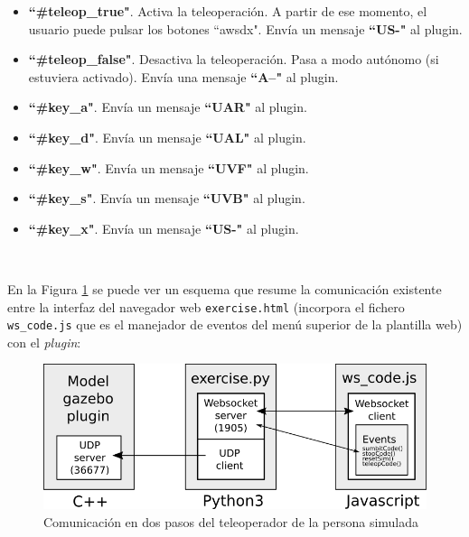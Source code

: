 \begin{itemize}
	\item \textbf{``\#teleop\_true"}. Activa la teleoperación. A partir de ese momento, el usuario puede pulsar los botones ``awsdx". Envía un mensaje \textbf{``US-"} al plugin.
	\item \textbf{``\#teleop\_false"}. Desactiva la teleoperación. Pasa a modo autónomo (si estuviera activado). Envía una mensaje \textbf{``A--"} al plugin.
	\item \textbf{``\#key\_a"}. Envía un mensaje \textbf{``UAR"} al plugin.
	\item \textbf{``\#key\_d"}. Envía un mensaje \textbf{``UAL"} al plugin.
	\item \textbf{``\#key\_w"}. Envía un mensaje \textbf{``UVF"} al plugin.
	\item \textbf{``\#key\_s"}. Envía un mensaje \textbf{``UVB"} al plugin.
	\item \textbf{``\#key\_x"}. Envía un mensaje \textbf{``US-"} al plugin.
\end{itemize}\

En la Figura \ref{fig:comunicacion_teleoperador} se puede ver un esquema que resume la comunicación existente entre la interfaz del navegador web \texttt{exercise.html} (incorpora el fichero \texttt{ws\_code.js} que es el manejador de eventos del menú superior de la plantilla web) con el \textit{plugin}:\\

\begin{figure} [H]
  \begin{center}
    \includegraphics[width=15cm]{imagenes/cap5/comunicacion-teleoperador.png}
  \end{center}
  \caption[Comunicación en dos pasos del teleoperador de la persona simulada]{Comunicación en dos pasos del teleoperador de la persona simulada}
  \label{fig:comunicacion_teleoperador}
\end{figure}\

